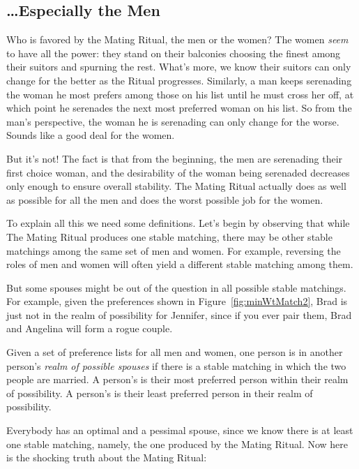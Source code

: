 \subsection{\dots Especially the Men}

Who is favored by the Mating Ritual, the men or the women?  The women
\emph{seem} to have all the power: they stand on their balconies
choosing the finest among their suitors and spurning the rest.  What's
more, we know their suitors can only change for the better as the
Ritual progresses.  Similarly, a man keeps serenading the woman he
most prefers among those on his list until he must cross her off, at
which point he serenades the next most preferred woman on his list.  So
from the man's perspective, the woman he is serenading can only change
for the worse.  Sounds like a good deal for the women.

But it's not!  The fact is that from the beginning, the men are
serenading their first choice woman, and the desirability of the woman
being serenaded decreases only enough to ensure overall stability.
The Mating Ritual actually does as well as possible for all the men
and does the worst possible job for the women.

To explain all this we need some definitions.  Let's begin by
observing that while The Mating Ritual produces one stable matching,
there may be other stable matchings among the same set of men and
women.  For example, reversing the roles of men and women will often
yield a different stable matching among them.

But some spouses might be out of the question in all possible stable
matchings.  For example, given the preferences shown in
Figure~\ref{fig:minWtMatch2}, Brad is just not in the realm of
possibility for Jennifer, since if you ever pair them, Brad and
Angelina will form a rogue couple.

\begin{definition}
Given a set of preference lists for all men and women, one person is
in another person's \emph{realm of possible spouses} if there is a
stable matching in which the two people are married.  A person's
 is their most preferred person within their
realm of possibility.  A person's  is their
least preferred person in their realm of possibility.
\end{definition}

Everybody has an optimal and a pessimal spouse, since we know there is at
least one stable matching, namely, the one produced by the Mating Ritual.
Now here is the shocking truth about the Mating Ritual:

